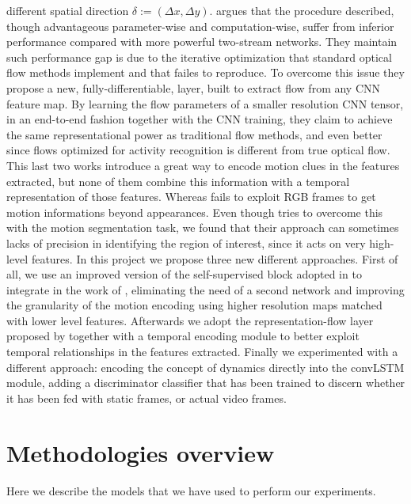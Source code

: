 \documentclass[10pt,twocolumn,hidelinks,letterpaper]{article}
\begin{document}
different spatial direction $\delta := (\Delta x, \Delta y)$. \cite{reprflow}
argues that the procedure described, though advantageous parameter-wise and computation-wise, suffer from inferior performance compared with more powerful two-stream networks. They maintain such performance gap is due to the iterative optimization that standard optical flow methods implement and that \cite{motfilt} failes to reproduce. To overcome this issue they propose a new, fully-differentiable, layer, built to extract flow from any CNN feature map. By learning the flow parameters of a smaller resolution CNN tensor, in an end-to-end fashion together with the CNN training, they claim to
achieve the same representational power as traditional flow methods, and even better since flows optimized for activity recognition is different from true optical flow.
This last two works introduce a great way to encode motion clues in the features extracted, but none of them combine this information with a temporal representation of those features. Whereas \cite{egornn} fails to exploit RGB frames to get motion informations beyond appearances. Even though \cite{sparnet} tries to overcome this with the motion segmentation task, we found that their approach can sometimes lacks of precision in identifying the region of interest, since it acts on very high-level features.
In this project we propose three new different approaches. First of all, we use an improved version of the self-supervised block adopted in \cite{sparnet}to integrate in the work of \cite{egornn}, eliminating the need of a second network and improving the granularity of the motion encoding using higher resolution maps matched with lower level features. Afterwards we adopt the representation-flow layer proposed by \cite{reprflow} together with a temporal encoding module to better exploit temporal relationships in the features extracted. Finally we experimented with a different approach: encoding the concept of dynamics directly into the convLSTM module, adding a discriminator classifier that has been trained to discern whether it has been fed with static frames, or actual video frames.

\section{Methodologies overview}
Here we describe the models that we have used to perform our experiments.
\end{document}
